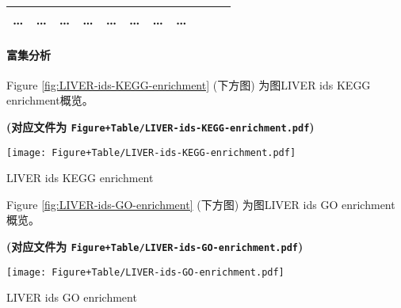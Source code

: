 \documentclass[
]{article}
\begin{document}
\begin{longtable}[]{@{}lllllllllll@{}}
\begin{minipage}[t]{0.09\columnwidth}
\ldots{}\strut
\end{minipage} & \begin{minipage}[t]{0.07\columnwidth}\raggedright
\ldots{}\strut
\end{minipage} & \begin{minipage}[t]{0.07\columnwidth}\raggedright
\ldots{}\strut
\end{minipage} & \begin{minipage}[t]{0.09\columnwidth}\raggedright
\ldots{}\strut
\end{minipage} & \begin{minipage}[t]{0.07\columnwidth}\raggedright
\ldots{}\strut
\end{minipage} & \begin{minipage}[t]{0.07\columnwidth}\raggedright
\ldots{}\strut
\end{minipage} & \begin{minipage}[t]{0.07\columnwidth}\raggedright
\ldots{}\strut
\end{minipage} & \begin{minipage}[t]{0.03\columnwidth}\raggedright
\ldots{}\strut
\end{minipage}\tabularnewline
\bottomrule
\end{longtable}

\hypertarget{en1}{%
\paragraph{富集分析}\label{en1}}

Figure \ref{fig:LIVER-ids-KEGG-enrichment} (下方图) 为图LIVER ids KEGG enrichment概览。

\textbf{(对应文件为 \texttt{Figure+Table/LIVER-ids-KEGG-enrichment.pdf})}

\def\@captype{figure}
\begin{center}
\texttt{[image: Figure+Table/LIVER-ids-KEGG-enrichment.pdf]}
\caption{LIVER ids KEGG enrichment}\label{fig:LIVER-ids-KEGG-enrichment}
\end{center}

Figure \ref{fig:LIVER-ids-GO-enrichment} (下方图) 为图LIVER ids GO enrichment概览。

\textbf{(对应文件为 \texttt{Figure+Table/LIVER-ids-GO-enrichment.pdf})}

\def\@captype{figure}
\begin{center}
\texttt{[image: Figure+Table/LIVER-ids-GO-enrichment.pdf]}
\caption{LIVER ids GO enrichment}\label{fig:LIVER-ids-GO-enrichment}
\end{center}
\end{document}
